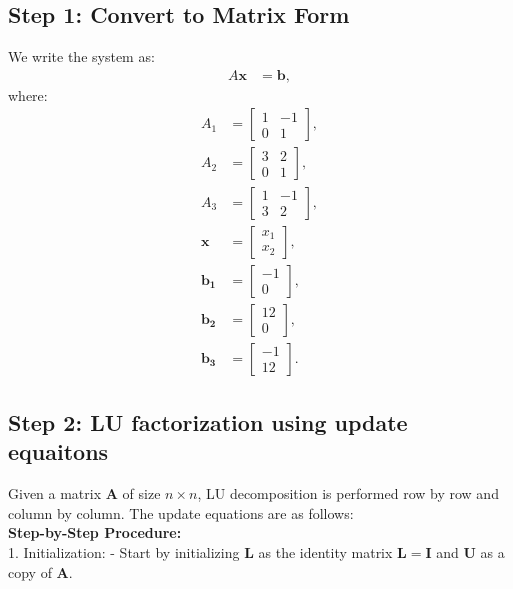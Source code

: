 \documentclass[journal]{IEEEtran}
\numberwithin{equation}{enumi}
\numberwithin{figure}{enumi}
\begin{document}
\begin{enumerate}
	\subsection*{Step 1: Convert to Matrix Form}
	We write the system as:
	\begin{align}
		A \mathbf{x} &= \mathbf{b},
	\end{align}
	where:
	\begin{align}
A_1 &= \begin{bmatrix} 1 & -1 \\ 0 & 1 \end{bmatrix},\\
A_2 &= \begin{bmatrix} 3 & 2 \\ 0 & 1 \end{bmatrix},\\
A_3 &= \begin{bmatrix} 1 & -1 \\ 3 & 2 \end{bmatrix},\\
\mathbf{x} &= \begin{bmatrix} x_1 \\ x_2 \end{bmatrix}, \\
\mathbf{b_1} &= \begin{bmatrix} -1 \\ 0 \end{bmatrix},\\
\mathbf{b_2} &= \begin{bmatrix} 12 \\ 0 \end{bmatrix},\\
\mathbf{b_3} &= \begin{bmatrix} -1 \\ 12 \end{bmatrix}.
	\end{align}
	
	\subsection*{Step 2: LU factorization using update equaitons}
    Given a matrix $ \mathbf{A} $ of size $ n \times n $, LU decomposition is performed row by row and column by column. The update equations are as follows:\\
    \textbf{Step-by-Step Procedure:}\\
1. Initialization: 
   - Start by initializing $ \mathbf{L} $ as the identity matrix $ \mathbf{L} = \mathbf{I} $ and $ \mathbf{U} $ as a copy of $ \mathbf{A} $.
   

\end{enumerate}
\end{document}
